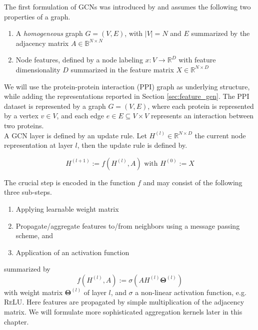 \documentclass[]{article}
\begin{document}
The first formulation of GCNs was introduced by \citet{GCNConv} and assumes the following two properties of a graph.

\begin{enumerate}
	\item A \textit{homogeneous} graph $G=(V,E)$, with $|V|=N$ and $E$ summarized by the adjacency matrix $A\in\mathbb{B}^{N\times N}$
	\item Node features, defined by a node labeling $x:V\rightarrow\mathbb{R}^D$ with feature dimensionality $D$ summarized in the feature matrix $X\in\mathbb{R}^{N\times D}$
\end{enumerate}

We will use the protein-protein interaction (PPI) graph as underlying structure, while adding the representations reported in Section \ref{sec:feature_gen}. The PPI dataset
is represented by a graph $G=(V,E)$, where each protein is represented
by a vertex $v\in V$, and each edge $e\in E\subseteq V\times V$
represents an interaction between two proteins.\\ 

A GCN layer is defined by an update rule. Let $H^{(l)}\in\mathbb{R}^{N\times D}$ the current node representation at layer $l$, then the update rule is defined by.

\begin{equation}
	H^{(l+1)}:=f\left(H^{(l)}, A\right) \text{ with } H^{(0)}:=X
\end{equation}

The crucial step is encoded in the function $f$ and may consist of the following three sub-steps.
\begin{enumerate}
	\item Applying learnable weight matrix
	\item Propagate/aggregate features to/from neighbors using a message passing scheme, and
	\item Application of an activation function
\end{enumerate}
summarized by 
\begin{equation}
	f\left( H^{(l)},A \right) :=\sigma \left( AH^{(l)}\mathbf{\Theta}^{(l)} \right)
\end{equation}
with weight matrix $\mathbf{\Theta}^{(l)}$ of layer $l$, and $\sigma$ a non-linear activation function, e.g. \textsc{ReLU}. Here features are propagated by simple multiplication of the adjacency matrix. We will formulate more sophisticated aggregation kernels later in this chapter.\\
\end{document}
